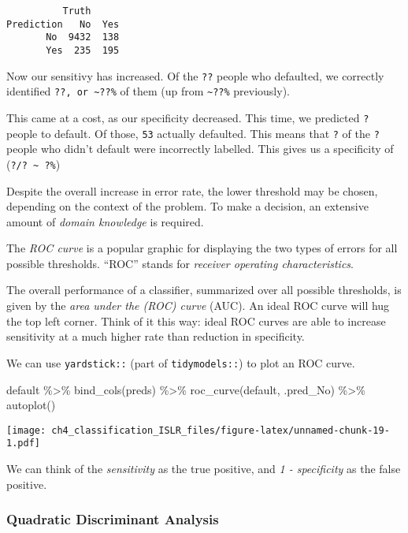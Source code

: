 \documentclass[
]{article}
\newenvironment{Shaded}{\begin{snugshade}}{\end{snugshade}}
\newcommand{\FunctionTok}[1]{\textcolor[rgb]{0.00,0.00,0.00}{#1}}
\newcommand{\NormalTok}[1]{#1}
\newcommand{\SpecialCharTok}[1]{\textcolor[rgb]{0.00,0.00,0.00}{#1}}
\begin{document}
\begin{verbatim}
          Truth
Prediction   No  Yes
       No  9432  138
       Yes  235  195
\end{verbatim}

Now our sensitivy has increased. Of the \texttt{??} people who
defaulted, we correctly identified
\texttt{??,\ or\ \textasciitilde{}??\%} of them (up from
\texttt{\textasciitilde{}??\%} previously).

This came at a cost, as our specificity decreased. This time, we
predicted \texttt{?} people to default. Of those, \texttt{53} actually
defaulted. This means that \texttt{?} of the \texttt{?} people who
didn't default were incorrectly labelled. This gives us a specificity of
(\texttt{?/?\ \textasciitilde{}\ ?\%})

Despite the overall increase in error rate, the lower threshold may be
chosen, depending on the context of the problem. To make a decision, an
extensive amount of \emph{domain knowledge} is required.

The \emph{ROC curve} is a popular graphic for displaying the two types
of errors for all possible thresholds. ``ROC'' stands for \emph{receiver
operating characteristics}.

The overall performance of a classifier, summarized over all possible
thresholds, is given by the \emph{area under the (ROC) curve} (AUC). An
ideal ROC curve will hug the top left corner. Think of it this way:
ideal ROC curves are able to increase sensitivity at a much higher rate
than reduction in specificity.

We can use \texttt{yardstick::} (part of \texttt{tidymodels::}) to plot
an ROC curve.

\begin{Shaded}
\begin{Highlighting}[]
\NormalTok{default }\SpecialCharTok{\%\textgreater{}\%}
  \FunctionTok{bind\_cols}\NormalTok{(preds) }\SpecialCharTok{\%\textgreater{}\%}
  \FunctionTok{roc\_curve}\NormalTok{(default, .pred\_No) }\SpecialCharTok{\%\textgreater{}\%}
  \FunctionTok{autoplot}\NormalTok{()}
\end{Highlighting}
\end{Shaded}

\texttt{[image: ch4\_classification\_ISLR\_files/figure-latex/unnamed-chunk-19-1.pdf]}

We can think of the \emph{sensitivity} as the true positive, and \emph{1
- specificity} as the false positive.

\hypertarget{quadratic-discriminant-analysis}{%
\subsubsection{Quadratic Discriminant
Analysis}\label{quadratic-discriminant-analysis}}
\end{document}
